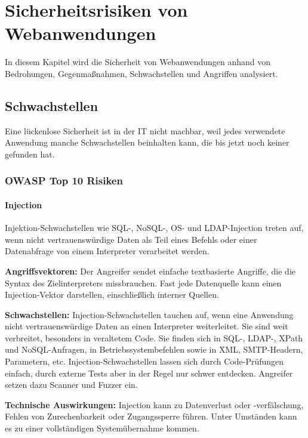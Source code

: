 \chapter{Sicherheitsrisiken von Webanwendungen}
\label{chap:k3}

In diesem Kapitel wird die Sicherheit von Webanwendungen anhand von Bedrohungen, Gegenmaßnahmen, Schwachstellen und Angriffen analysiert.

\section{Schwachstellen}

Eine lückenlose Sicherheit ist in der IT nicht machbar, weil jedes verwendete Anwendung manche Schwachstellen beinhalten kann, die bis jetzt noch keiner gefunden hat.

\subsection{OWASP Top 10 Risiken}

\subsubsection{Injection}

Injektion-Schwachstellen wie SQL-, NoSQL-, OS- und LDAP-Injection treten auf, wenn nicht vertrauenswürdige Daten als Teil eines Befehls oder einer Datenabfrage von einem Interpreter verarbeitet werden\cite[6]{owasp17top10}.

\textbf{Angriffsvektoren:} Der Angreifer sendet einfache textbasierte Angriffe, die die Syntax des Zielinterpreters missbrauchen. Fast jede Datenquelle kann einen Injection-Vektor darstellen, einschließlich interner Quellen\cite[7]{owasp17top10}.

\textbf{Schwachstellen:} Injection-Schwachstellen tauchen auf, wenn eine Anwendung nicht vertrauenswürdige Daten an einen Interpreter weiterleitet. Sie sind weit verbreitet, besonders in veraltetem Code. Sie finden sich in SQL-, LDAP-, XPath und NoSQL-Anfragen, in Betriebssystembefehlen sowie in XML, SMTP-Headern, Parametern, etc. Injection-Schwachstellen lassen sich durch Code-Prüfungen einfach, durch externe Tests aber in der Regel nur schwer entdecken. Angreifer setzen dazu Scanner und Fuzzer ein\cite[7]{owasp17top10}.

\textbf{Technische Auswirkungen:} Injection kann zu Datenverlust oder -verfälschung, Fehlen von Zurechenbarkeit oder Zugangssperre führen. Unter Umständen kann es zu einer vollständigen Systemübernahme kommen\cite[7]{owasp17top10}.\\

